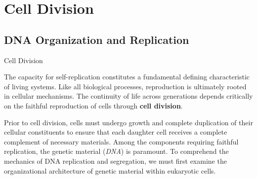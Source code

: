 \documentclass[10pt]{article}
\begin{document}
\section{Cell Division}

  \subsection{DNA Organization and Replication}

    \begin{core}{Cell Division}

      The capacity for self-replication constitutes a fundamental defining characteristic of living systems. Like all biological processes, reproduction is ultimately rooted in cellular mechanisms. The continuity of life across generations depends critically on the faithful reproduction of cells through \textbf{cell division}.

      Prior to cell division, cells must undergo growth and complete duplication of their cellular constituents to ensure that each daughter cell receives a complete complement of necessary materials. Among the components requiring faithful replication, the genetic material (\textit{DNA}) is paramount. To comprehend the mechanics of DNA replication and segregation, we must first examine the organizational architecture of genetic material within eukaryotic cells.

    \end{core}
\end{document}
